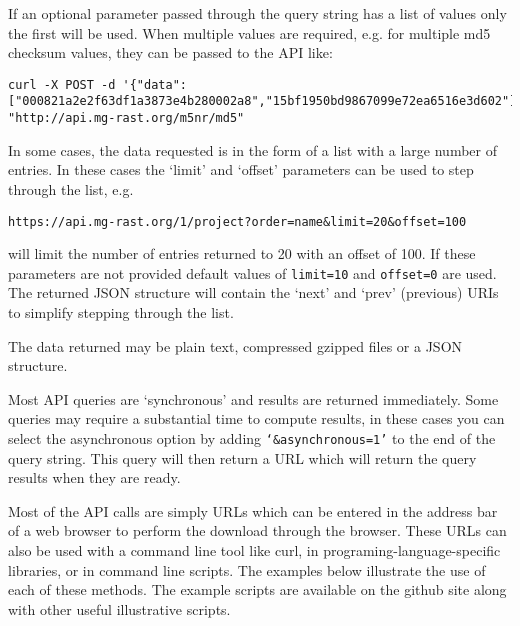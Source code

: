 If an optional parameter passed through the query string has a list of values only the first will be used. When multiple values are required, e.g. for multiple md5 checksum values, they can be passed to the API like:
\begin{small}
\begin{lstlisting}
curl -X POST -d '{"data":["000821a2e2f63df1a3873e4b280002a8","15bf1950bd9867099e72ea6516e3d602"]}' "http://api.mg-rast.org/m5nr/md5"
\end{lstlisting}
\end{small}

In some cases, the data requested is in the form of a list with a large number of entries. In these cases the `limit' and `offset' parameters can be used to step through the list, e.g.
\begin{small}
\begin{lstlisting}
https://api.mg-rast.org/1/project?order=name&limit=20&offset=100
\end{lstlisting}
\end{small} will limit the number of entries returned to 20 with an offset of 100. If these parameters are not provided default values of \texttt{limit=10} and \texttt{offset=0} are used. The returned JSON structure will contain the `next' and `prev' (previous) URIs to simplify stepping through the list.

The data returned may be plain text, compressed gzipped files or a JSON structure. 

Most API queries are `synchronous' and results are returned immediately. Some queries may require a substantial time to compute results, in these cases you can select the asynchronous option by adding \texttt{`\&asynchronous=1'} to the end of the query string. This query will then return a URL which will return the query results when they are ready.

Most of the API calls are simply URLs which can be entered in the address bar of a web browser to perform the download through the browser. These URLs can also be used with a command line tool like curl, in programing-language-specific libraries, or in command line scripts. The examples below illustrate the use of each of these methods. The example scripts are available on the github site along with other useful illustrative scripts.

